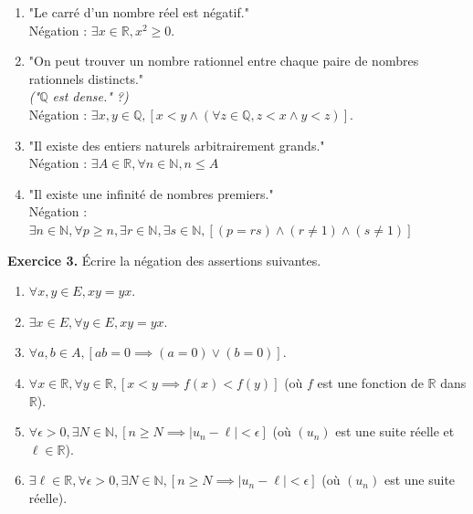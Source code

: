 \documentclass[a4paper, 10pt]{report}
\providecommand{\abs}[1]{\lvert#1\rvert}
\begin{document}
	\colorbox{solution}
	{
		\begin{minipage}{0.9\textwidth}
			\begin{enumerate}[label=(\roman*)]
				\item "Le carré d'un nombre réel est négatif."\\
				Négation : $\exists x \in \mathbb{R}, x^2 \geq 0$.
				\item "On peut trouver un nombre rationnel entre
				chaque paire de nombres rationnels distincts."\\
				\textit{("$\mathbb{Q}$ est dense." ?)}\\
				Négation : $\exists x,y \in \mathbb{Q},
					[x < y \land (\forall z \in \mathbb{Q},
					z < x \land y < z)]$.
				\item "Il existe des entiers naturels arbitrairement
				grands."\\
				Négation : $\exists A \in \mathbb{R},
					\forall n \in \mathbb{N}, n \leq A$
				\item "Il existe une infinité de nombres premiers."\\
				Négation : $\exists n \in \mathbb{N}, \forall p \geq n,
					\exists r \in \mathbb{N}, \exists s \in \mathbb{N},
					[(p = rs) \land (r \neq 1) \land (s \neq 1)]$
			\end{enumerate}
		\end{minipage}
	}
	
	\vspace{5mm}
	\noindent
	\textbf{Exercice 3.} Écrire la négation des assertions suivantes.
	\begin{enumerate}[label=(\roman*)]
		\item $\forall x,y \in E, xy = yx$.
		\item $\exists x \in E, \forall y \in E, xy = yx$.
		\item $\forall a,b \in A, [ab = 0 \implies
			(a = 0) \lor (b = 0)]$.
		\item $\forall x \in \mathbb{R}, \forall y \in \mathbb{R},
			[x < y \implies f(x) < f(y)]$ (où $f$ est une fonction
			de $\mathbb{R}$ dans $\mathbb{R}$).
		\item $\forall \epsilon > 0, \exists N \in \mathbb{N},
			[n \geq N \implies \abs{u_n - \ell} < \epsilon]$
			(où $(u_n)$ est une suite réelle et $\ell \in \mathbb{R}$).
		\item $\exists \ell \in \mathbb{R}, \forall \epsilon > 0,
			\exists N \in \mathbb{N}, [n \geq N \implies
			\abs{u_n - \ell} < \epsilon]$
			(où $(u_n)$ est une suite réelle).
	\end{enumerate}
	
\end{document}
